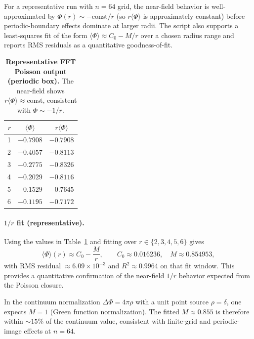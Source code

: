 For a representative run with $n=64$ grid, the near-field behavior is well-approximated by $\Phi(r)\sim -\mathrm{const}/r$ (so $r\langle\Phi\rangle$ is approximately constant) before periodic-boundary effects dominate at larger radii. The script also supports a least-squares fit of the form $\langle\Phi\rangle \approx C_0 - M/r$ over a chosen radius range and reports RMS residuals as a quantitative goodness-of-fit.
\begin{table}[t]
\centering
\begin{tabular}{@{}rcc@{}}
\toprule
$r$ & $\langle \Phi\rangle$ & $r\langle\Phi\rangle$ \\
\midrule
1 & $-0.7908$ & $-0.7908$ \\
2 & $-0.4057$ & $-0.8113$ \\
3 & $-0.2775$ & $-0.8326$ \\
4 & $-0.2029$ & $-0.8116$ \\
5 & $-0.1529$ & $-0.7645$ \\
6 & $-0.1195$ & $-0.7172$ \\
\bottomrule
\end{tabular}
\caption{\textbf{Representative FFT Poisson output (periodic box).} The near-field shows $r\langle\Phi\rangle\approx\text{const}$, consistent with $\Phi\sim -1/r$.}
\label{tab:poisson}
\end{table}

\paragraph{$1/r$ fit (representative).}
Using the values in Table~\ref{tab:poisson} and fitting over $r\in\{2,3,4,5,6\}$ gives
\begin{equation}
  \langle\Phi\rangle(r) \approx C_0 - \frac{M}{r},
  \qquad
  C_0 \approx 0.016236,\quad M\approx 0.854953,
\end{equation}
with RMS residual $\approx 6.09\times 10^{-3}$ and $R^2\approx 0.9964$ on that fit window. This provides a quantitative confirmation of the near-field $1/r$ behavior expected from the Poisson closure.

In the continuum normalization $\Delta\Phi=4\pi\rho$ with a unit point source $\rho=\delta$, one expects $M=1$ (Green function normalization). The fitted $M\approx 0.855$ is therefore within $\sim 15\%$ of the continuum value, consistent with finite-grid and periodic-image effects at $n=64$.


